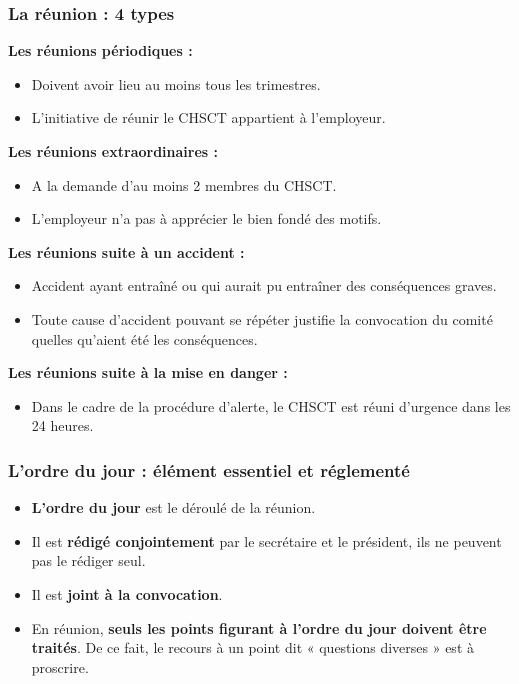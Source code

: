 \documentclass{beamer}
\begin{document}
\begin{frame}
\frametitle{La réunion : 4 types}

\textbf{Les réunions périodiques :}

\begin{itemize}
\item Doivent avoir lieu au moins tous les trimestres.
\item L’initiative de réunir le CHSCT appartient à l’employeur.
\end{itemize}

\textbf{Les réunions extraordinaires :}
\begin{itemize}
\item A la demande d’au moins 2 membres du CHSCT.

\item L’employeur n’a pas à apprécier le bien fondé des motifs.
\end{itemize}

\textbf{Les réunions suite à un accident :}
\begin{itemize}
\item Accident ayant entraîné ou qui aurait pu entraîner des conséquences graves.

\item Toute cause d’accident pouvant se répéter justifie la convocation du comité quelles qu’aient été les conséquences.
\end{itemize}

\textbf{Les réunions suite à la mise en danger :}
\begin{itemize}
\item Dans le cadre de la procédure d’alerte, le CHSCT est réuni d’urgence dans les 24 heures.
\end{itemize}
\end{frame}

\begin{frame}
\frametitle{L’ordre du jour : élément essentiel et réglementé}

\begin{itemize}
\item \textbf{L’ordre du jour} est le déroulé de la réunion. 

\item Il est \textbf{rédigé conjointement} par le secrétaire et le président, ils ne peuvent pas le rédiger seul. 

\item Il est \textbf{joint à la convocation}. 

\item En réunion, \textbf{seuls les points figurant à l’ordre du jour doivent être traités}. De ce fait, le recours à un point dit « questions diverses » est à proscrire.
\end{itemize}
\end{frame}
\end{document}
